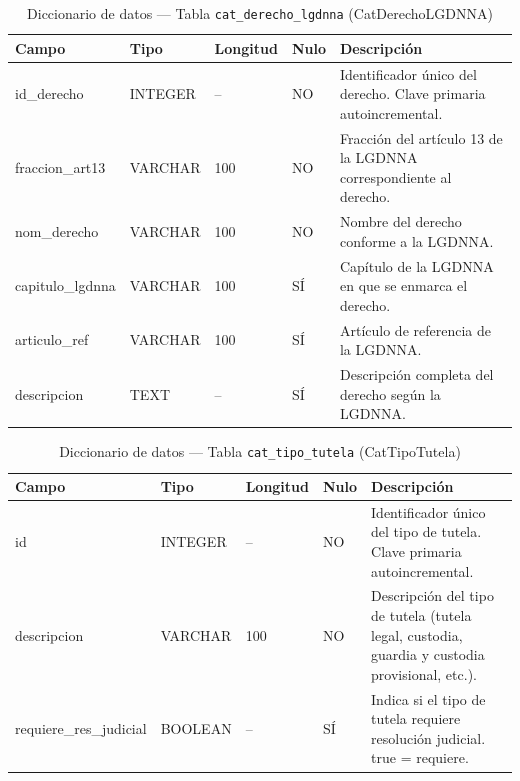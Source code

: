 \begin{table}[H]
	\centering
	\caption{Diccionario de datos --- Tabla \texttt{cat\_derecho\_lgdnna} (CatDerechoLGDNNA)}
	\label{tab:data-dict-cat_derecho_lgdnna}
	\scriptsize
	\begin{tabular}{>{\ttfamily\raggedright\arraybackslash}p{3.6cm} p{1.6cm} p{1.3cm} p{0.7cm} p{5.6cm}}
		\toprule
		\textbf{Campo} & \textbf{Tipo} & \textbf{Longitud} & \textbf{Nulo} & \textbf{Descripción} \\
		\midrule
		id\_derecho & INTEGER & -- & NO & Identificador único del derecho. Clave primaria autoincremental. \\
		fraccion\_art13 & VARCHAR & 100 & NO & Fracción del artículo 13 de la LGDNNA correspondiente al derecho. \\
		nom\_derecho & VARCHAR & 100 & NO & Nombre del derecho conforme a la LGDNNA. \\
		capitulo\_lgdnna & VARCHAR & 100 & SÍ & Capítulo de la LGDNNA en que se enmarca el derecho. \\
		articulo\_ref & VARCHAR & 100 & SÍ & Artículo de referencia de la LGDNNA. \\
		descripcion & TEXT & -- & SÍ & Descripción completa del derecho según la LGDNNA. \\
		\bottomrule
	\end{tabular}
\end{table}

\begin{table}[H]
	\centering
	\caption{Diccionario de datos --- Tabla \texttt{cat\_tipo\_tutela} (CatTipoTutela)}
	\label{tab:data-dict-cat_tipo_tutela}
	\scriptsize
	\begin{tabular}{>{\ttfamily\raggedright\arraybackslash}p{3.6cm} p{1.6cm} p{1.3cm} p{0.7cm} p{5.6cm}}
		\toprule
		\textbf{Campo} & \textbf{Tipo} & \textbf{Longitud} & \textbf{Nulo} & \textbf{Descripción} \\
		\midrule
		id & INTEGER & -- & NO & Identificador único del tipo de tutela. Clave primaria autoincremental. \\
		descripcion & VARCHAR & 100 & NO & Descripción del tipo de tutela (tutela legal, custodia, guardia y custodia provisional, etc.). \\
		requiere\_res\_judicial & BOOLEAN & -- & SÍ & Indica si el tipo de tutela requiere resolución judicial. true = requiere. \\
		\bottomrule
	\end{tabular}
\end{table}


